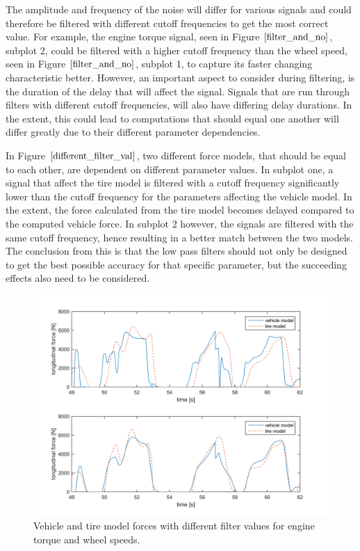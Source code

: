 The amplitude and frequency of the noise will differ for various signals and could therefore be filtered with different cutoff frequencies to get the most correct value. For example, the engine torque signal, seen in Figure $ \ref{filter_and_no} $, subplot 2, could be filtered with a higher cutoff frequency than the wheel speed, seen in Figure $ \ref{filter_and_no} $, subplot 1, to capture its faster changing characteristic better. However, an important aspect to consider during filtering, is the duration of the delay that will affect the signal. Signals that are run through filters with different cutoff frequencies, will also have differing delay durations. In the extent, this could lead to computations that should equal one another will differ greatly due to their different parameter dependencies. 

In Figure $ \ref{different_filter_val} $, two different force models, that should be equal to each other, are dependent on different parameter values. In subplot one, a signal that affect the tire model is filtered with a cutoff frequency significantly lower than the cutoff frequency for the parameters affecting the vehicle model. In the extent, the force calculated from the tire model becomes delayed compared to the computed vehicle force. In subplot 2 however, the signals are filtered with the same cutoff frequency, hence resulting in a better match between the two models. The conclusion from this is that the low pass filters should not only be designed to get the best possible accuracy for that specific parameter, but the succeeding effects also need to be considered.

\begin{figure}[h]
	\centering
	\includegraphics[width=1.0\textwidth]{Pictures/different_filter_val}
	\caption {Vehicle and tire model forces with different filter values for engine torque and wheel speeds.}
	\label{different_filter_val}
\end{figure}

